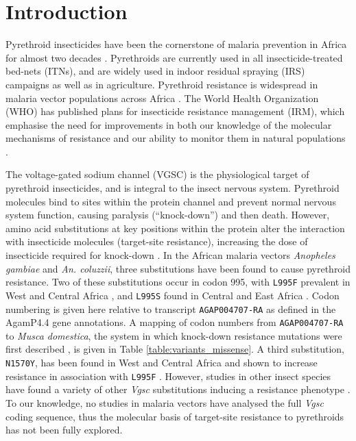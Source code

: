 \documentclass[a4paper,11pt,abstracton,hidelinks]{scrartcl}
\begin{document}
\begin{abstract}
\end{abstract}


\section*{Introduction}


Pyrethroid insecticides have been the cornerstone of malaria prevention in Africa for almost two decades \cite{Bhatt2015}.
%
Pyrethroids are currently used in all insecticide-treated bed-nets (ITNs), and are widely used in indoor residual spraying (IRS) campaigns as well as in agriculture.
%
Pyrethroid resistance is widespread in malaria vector populations across Africa \cite{Hemingway2016}.
%
The World Health Organization (WHO) has published plans for insecticide resistance management (IRM), which emphasise the need for improvements in both our knowledge of the molecular mechanisms of resistance and our ability to monitor them in natural populations \cite{WorldHealthOrganization2012}.


The voltage-gated sodium channel (VGSC) is the physiological target of pyrethroid insecticides, and is integral to the insect nervous system.
%
Pyrethroid molecules bind to sites within the protein channel and prevent normal nervous system function, causing paralysis (``knock-down'') and then death.
%
However, amino acid substitutions at key positions within the protein alter the interaction with insecticide molecules (target-site resistance), increasing the dose of insecticide required for knock-down \cite{Davies2007a,Dong2014}.
%
In the African malaria vectors \textit{Anopheles gambiae} and \textit{An. coluzzii}, three substitutions have been found to cause pyrethroid resistance.
%
Two of these substitutions occur in codon 995, with \texttt{L995F} prevalent in West and Central Africa \cite{Martinez-Torres1998,Silva2014}, and \texttt{L995S} found in Central and East Africa \cite{Ranson2000,Silva2014}.
%
Codon numbering is given here relative to transcript \texttt{AGAP004707-RA} as defined in the AgamP4.4 gene annotations.
%
A mapping of codon numbers from \texttt{AGAP004707-RA} to \emph{Musca domestica}, the system in which knock-down resistance mutations were first described \cite{Williamson1996}, is given in Table \ref{table:variants_missense}.
%
A third substitution, \texttt{N1570Y}, has been found in West and Central Africa and shown to increase resistance in association with \texttt{L995F} \cite{Jones2012}.
%
However, studies in other insect species have found a variety of other \emph{Vgsc} substitutions inducing a resistance phenotype \cite{Davies2007b,Rinkevich2013,Dong2014}.
%
To our knowledge, no studies in malaria vectors have analysed the full \emph{Vgsc} coding sequence, thus the molecular basis of target-site resistance to pyrethroids has not been fully explored.
\end{document}

